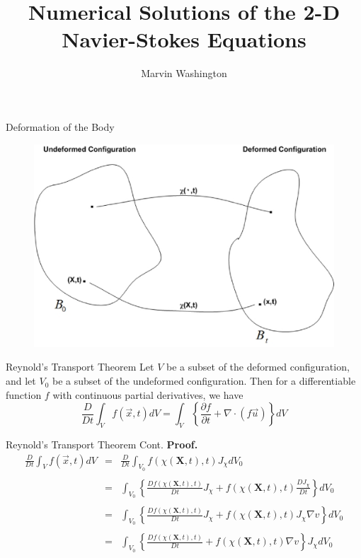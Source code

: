 \documentclass[frames]{prosper}
\title{Numerical Solutions of the 2-D Navier-Stokes Equations}
\author{Marvin Washington}
\begin{document}
\maketitle
\begin{slide}[Wipe]{Deformation of the Body}
\begin{figure}
\begin{center}
\includegraphics[scale = .3]{config_gragh_marvin.eps}
\end{center}
\end{figure}
\end{slide}

\begin{slide}[Box]{Reynold's Transport Theorem}
Let $V$ be a subset of the deformed configuration, and let $V_{0}$ be a subset of the undeformed configuration. Then for a differentiable function $f$ with continuous partial derivatives, we have
$$\frac{D}{Dt} \int_{V} f(\stackrel{\rightarrow}{x},t)dV = \int_{V}\left\{ {\frac{\partial f}{\partial t} + \nabla\cdot(f\stackrel{\rightarrow}{u})}\right\}dV$$
\end{slide}

\begin{slide}[Box]{Reynold's Transport Theorem Cont.}
\textbf{Proof.}
\begin{eqnarray*}
 \frac{D}{Dt} \int_{V} f(\stackrel{\rightarrow}{x},t)dV &=& \frac{D}{Dt} \int_{V_{0}} f(\chi(\textbf{X},t),t)J_{\chi}dV_{0}\\ \\
 &=& \int_{V_{0}}\left\{\frac{Df(\chi(\textbf{X},t),t)}{Dt}J_{\chi} + f(\chi(\textbf{X},t),t)\frac{DJ_{\chi}}{Dt}\right\}dV_{0}\\ \\ 
 &=& \int_{V_{0}}\left\{\frac{Df(\chi(\textbf{X},t),t)}{Dt}J_{\chi} + f(\chi(\textbf{X},t),t)J_{\chi}\nabla v\right\}dV_{0}\\ \\
 &=& \int_{V_{0}}\left\{\frac{Df(\chi(\textbf{X},t),t)}{Dt} + f(\chi(\textbf{X},t),t)\nabla v\right\}J_{\chi}dV_{0}\\ \\
 \end{eqnarray*}
\end{slide}
\end{document}
